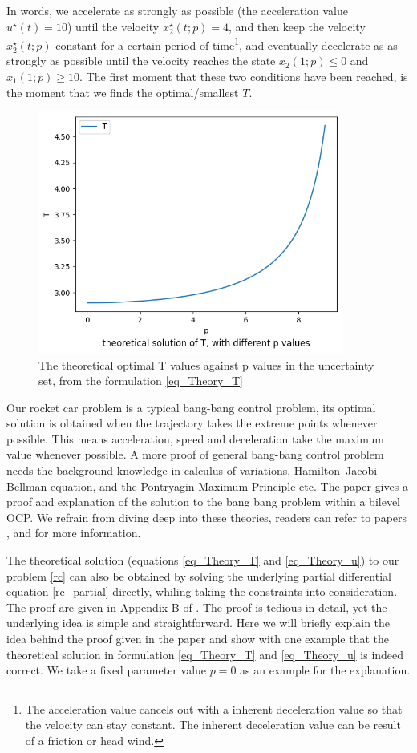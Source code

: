 \documentclass  [
  paper    = a4,
  BCOR     = 10mm,
  twoside,
  fontsize = 12pt,
  fleqn,
  toc      = bibnumbered,
  toc      = listofnumbered,
  numbers  = noendperiod,
  headings = normal,
  listof   = leveldown,
  version  = 3.03
]                                       {scrreprt}
\newcommand{\<}{\langle}
\renewcommand{\>}{\rangle}
\begin{document}
In words, we accelerate as strongly as possible (the acceleration value $u^\star(t)=10$) until the velocity $x^\star_2(t;p)=4$, and then keep the velocity $x^\star_2(t;p)$ constant for a certain period of time\footnote{The acceleration value cancels out with a inherent deceleration value so that the velocity can stay constant. The inherent deceleration value can be result of a friction or head wind.}, and eventually decelerate as as strongly as possible until the velocity reaches the state $x_2(1;p) \leq 0$ and $x_1(1;p) \geq 10$. The first moment that these two conditions have been reached, is the moment that we finds the optimal/smallest $T$.

\begin{figure}[h]
	\centerline{\includegraphics[width=10cm]{theory_T_diff_p.png}}
	\caption{The theoretical optimal T values against p values in the uncertainty set, from the formulation \ref{eq_Theory_T}}
	\label{theory_T_diff_p}
\end{figure}



Our rocket car problem is a typical bang-bang control problem, its optimal solution is obtained when the trajectory takes the extreme points whenever possible. This means acceleration, speed and deceleration take the maximum value whenever possible. A more proof of general bang-bang control problem needs the background knowledge in calculus of variations, Hamilton–Jacobi–Bellman equation, and the Pontryagin Maximum Principle etc. The paper \cite{KM16} gives a proof and explanation of the solution to the bang bang problem within a bilevel OCP. We refrain from diving deep into these theories, readers can refer to papers \cite{EJ89}, \cite{RV99} and \cite{BD05} for more information. 
 
The theoretical solution (equations \ref{eq_Theory_T} and \ref{eq_Theory_u}) to our problem \ref{rc} can also be obtained by solving the underlying partial differential equation \ref{rc_partial} directly, whiling taking the constraints into consideration. The proof are given in Appendix B of \cite{MatSch22}. The proof is tedious in detail, yet the underlying idea is simple and straightforward. Here we will briefly explain the idea behind the proof given in the paper \cite{MatSch22} and show with one example that the theoretical solution in formulation \ref{eq_Theory_T} and \ref{eq_Theory_u} is indeed correct. We take a fixed parameter value $p=0$ as an example for the explanation.
\end{document}
